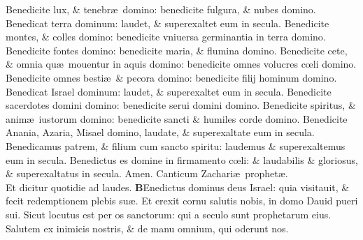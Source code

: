 \documentclass[a5paper,10pt]{book}
\def\ae{æ}
\def\oe{œ}
\begin{document}
\begin{multicols*}{2}
\newline \color{red} B\color{black}enedicite lux, \& tenebr\ae \ domino: benedicite fulgura, \& nubes domino.
\newline \color{red} B\color{black}enedicat terra dominum: laudet, \& superexaltet eum in secula.
\newline \color{red} B\color{black}enedicite montes, \& colles domino: benedicite vniuersa germinantia in terra domino.
\newline \color{red} B\color{black}enedicite fontes domino: benedicite maria, \& flumina domino.
\newline \color{red} B\color{black}enedicite cete, \& omnia qu\ae \ mouentur in aquis domino: benedicite omnes volucres c\oe li domino.
\newline \color{red} B\color{black}enedicite omnes besti\ae \ \& pecora domino: benedicite filij hominum domino.
\newline \color{red} B\color{black}enedicat Israel dominum: laudet, \& superexaltet eum in secula.
\newline \color{red} B\color{black}enedicite sacerdotes domini domino: benedicite serui domini domino.
\newline \color{red} B\color{black}enedicite spiritus, \& anim\ae \ iustorum domino: benedicite sancti \& humiles corde domino.
\newline \color{red} B\color{black}enedicite Anania, Azaria, Misael domino, laudate, \& superexaltate eum in secula.
\newline \color{red} B\color{black}enedicamus patrem, \& filium cum sancto spiritu: laudemus \& superexaltemus eum in secula.
\newline \color{red} B\color{black}enedictus es domine in firmamento c\oe li: \& laudabilis \& gloriosus, \& superexaltatus in secula. Amen.
\newline {} \color{red} \hypertarget{Benedictus}{Canticum} Zachari\ae \ prophet\ae .\\Et dicitur quotidie ad laudes. \color{black}
\vspace{-1em}
\lettrine[lines=2]{\bfseries \color{red} B}{}Enedictus dominus deus Israel: quia visitauit, \& fecit redemptionem plebis su\ae .
\newline \color{red} E\color{black}t erexit cornu salutis nobis, in domo Dauid pueri sui.
\newline \color{red} S\color{black}icut locutus est per os sanctorum: qui a seculo sunt prophetarum eius.
\newline \color{red} S\color{black}alutem ex inimicis nostris, \& de manu omnium, qui oderunt nos.

\end{multicols*}
\end{document}
